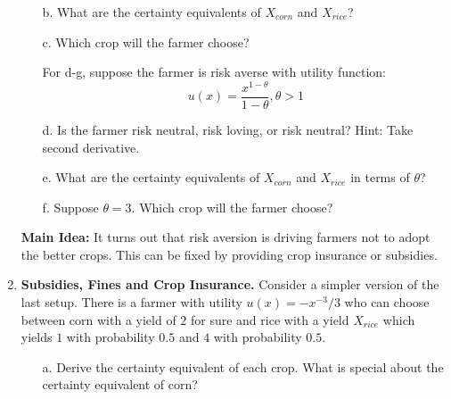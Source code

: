 \documentclass{article}
\begin{document}
\begin{enumerate}
\begin{itemize}
        \vspace{2cm}
        
        \item[b.] What are the certainty equivalents of $X_{corn}$ and $X_{rice}$?
        
         \vspace{5cm}
         
        \item[c.] Which crop will the farmer choose?
        
        \vspace{2cm}
        
    For d-g, suppose the farmer is risk averse with utility function:
    \[u(x) = \frac{x^{1-\theta}}{1-\theta}, \theta>1 \]
    \item[d.] Is the farmer risk neutral, risk loving, or risk neutral? Hint: Take second derivative.
    
    \vspace{3cm}
    
    \item[e.] What are the certainty equivalents of $X_{corn}$ and $X_{rice}$ in terms of $\theta$?
    
    \vspace{5cm}
    
    \item[f.] Suppose $\theta=3$. Which crop will the farmer choose?

    \vspace{3cm}
    
    \end{itemize}
    
    \textbf{Main Idea:} It turns out that risk aversion is driving farmers not to adopt the better crops. This can be fixed by providing crop insurance or subsidies.
    \item \textbf{Subsidies, Fines and Crop Insurance.} Consider a simpler version of the last setup. There is a farmer with utility $u(x)=-x^{-3}/3$ who can choose between corn with a yield of $2$ for sure and rice with a yield $X_{rice}$ which yields $1$ with probability $0.5$ and $4$ with probability $0.5$.
    \begin{enumerate}
        \item[a.] Derive the certainty equivalent of each crop. What is special about the certainty equivalent of corn?
        
        \vspace{4cm}
        

\end{enumerate}
\end{enumerate}
\end{document}

